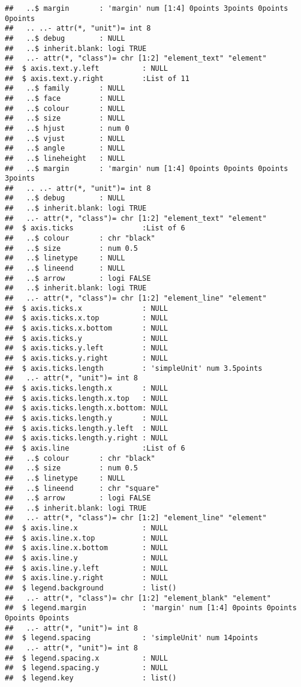 \documentclass[
]{article}
\begin{document}
\begin{verbatim}
##   ..$ margin       : 'margin' num [1:4] 0points 3points 0points 0points
##   .. ..- attr(*, "unit")= int 8
##   ..$ debug        : NULL
##   ..$ inherit.blank: logi TRUE
##   ..- attr(*, "class")= chr [1:2] "element_text" "element"
##  $ axis.text.y.left          : NULL
##  $ axis.text.y.right         :List of 11
##   ..$ family       : NULL
##   ..$ face         : NULL
##   ..$ colour       : NULL
##   ..$ size         : NULL
##   ..$ hjust        : num 0
##   ..$ vjust        : NULL
##   ..$ angle        : NULL
##   ..$ lineheight   : NULL
##   ..$ margin       : 'margin' num [1:4] 0points 0points 0points 3points
##   .. ..- attr(*, "unit")= int 8
##   ..$ debug        : NULL
##   ..$ inherit.blank: logi TRUE
##   ..- attr(*, "class")= chr [1:2] "element_text" "element"
##  $ axis.ticks                :List of 6
##   ..$ colour       : chr "black"
##   ..$ size         : num 0.5
##   ..$ linetype     : NULL
##   ..$ lineend      : NULL
##   ..$ arrow        : logi FALSE
##   ..$ inherit.blank: logi TRUE
##   ..- attr(*, "class")= chr [1:2] "element_line" "element"
##  $ axis.ticks.x              : NULL
##  $ axis.ticks.x.top          : NULL
##  $ axis.ticks.x.bottom       : NULL
##  $ axis.ticks.y              : NULL
##  $ axis.ticks.y.left         : NULL
##  $ axis.ticks.y.right        : NULL
##  $ axis.ticks.length         : 'simpleUnit' num 3.5points
##   ..- attr(*, "unit")= int 8
##  $ axis.ticks.length.x       : NULL
##  $ axis.ticks.length.x.top   : NULL
##  $ axis.ticks.length.x.bottom: NULL
##  $ axis.ticks.length.y       : NULL
##  $ axis.ticks.length.y.left  : NULL
##  $ axis.ticks.length.y.right : NULL
##  $ axis.line                 :List of 6
##   ..$ colour       : chr "black"
##   ..$ size         : num 0.5
##   ..$ linetype     : NULL
##   ..$ lineend      : chr "square"
##   ..$ arrow        : logi FALSE
##   ..$ inherit.blank: logi TRUE
##   ..- attr(*, "class")= chr [1:2] "element_line" "element"
##  $ axis.line.x               : NULL
##  $ axis.line.x.top           : NULL
##  $ axis.line.x.bottom        : NULL
##  $ axis.line.y               : NULL
##  $ axis.line.y.left          : NULL
##  $ axis.line.y.right         : NULL
##  $ legend.background         : list()
##   ..- attr(*, "class")= chr [1:2] "element_blank" "element"
##  $ legend.margin             : 'margin' num [1:4] 0points 0points 0points 0points
##   ..- attr(*, "unit")= int 8
##  $ legend.spacing            : 'simpleUnit' num 14points
##   ..- attr(*, "unit")= int 8
##  $ legend.spacing.x          : NULL
##  $ legend.spacing.y          : NULL
##  $ legend.key                : list()

\end{verbatim}
\end{document}
